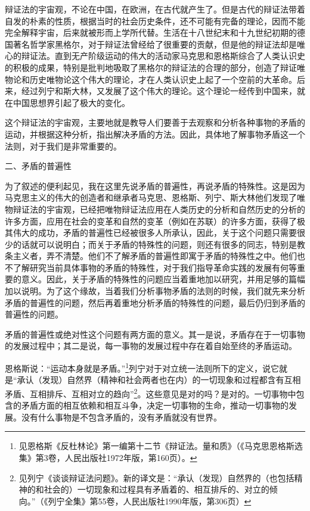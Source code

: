 \documentclass[UTF8, 12pt, a4paper]{ctexrep}
\begin{document}
辩证法的宇宙观，不论在中国，在欧洲，在古代就产生了。但是古代的辩证法带着自发的朴素的性质，根据当时的社会历史条件，还不可能有完备的理论，因而不能完全解释宇宙，后来就被形而上学所代替。生活在十八世纪末和十九世纪初期的德国著名哲学家黑格尔，对于辩证法曾经给了很重要的贡献，但是他的辩证法却是唯心的辩证法。直到无产阶级运动的伟大的活动家马克思和恩格斯综合了人类认识史的积极的成果，特别是批判地吸取了黑格尔的辩证法的合理的部分，创造了辩证唯物论和历史唯物论这个伟大的理论，才在人类认识史上起了一个空前的大革命。后来，经过列宁和斯大林，又发展了这个伟大的理论。这个理论一经传到中国来，就在中国思想界引起了极大的变化。

这个辩证法的宇宙观，主要地就是教导人们要善于去观察和分析各种事物的矛盾的运动，并根据这种分析，指出解决矛盾的方法。因此，具体地了解事物矛盾这一个法则，对于我们是非常重要的。

二、矛盾的普遍性

为了叙述的便利起见，我在这里先说矛盾的普遍性，再说矛盾的特殊性。这是因为马克思主义的伟大的创造者和继承者马克思、恩格斯、列宁、斯大林他们发现了唯物辩证法的宇宙观，已经把唯物辩证法应用在人类历史的分析和自然历史的分析的许多方面，应用在社会的变革和自然的变革（例如在苏联）的许多方面，获得了极其伟大的成功，矛盾的普遍性已经被很多人所承认，因此，关于这个问题只需要很少的话就可以说明白；而关于矛盾的特殊性的问题，则还有很多的同志，特别是教条主义者，弄不清楚。他们不了解矛盾的普遍性即寓于矛盾的特殊性之中。他们也不了解研究当前具体事物的矛盾的特殊性，对于我们指导革命实践的发展有何等重要的意义。因此，关于矛盾的特殊性的问题应当着重地加以研究，并用足够的篇幅加以说明。为了这个缘故，当着我们分析事物矛盾的法则的时候，我们就先来分析矛盾的普遍性的问题，然后再着重地分析矛盾的特殊性的问题，最后仍归到矛盾的普遍性的问题。

矛盾的普遍性或绝对性这个问题有两方面的意义。其一是说，矛盾存在于一切事物的发展过程中；其二是说，每一事物的发展过程中存在着自始至终的矛盾运动。

恩格斯说：“运动本身就是矛盾。”\footnote{见恩格斯《反杜林论》第一编第十二节《辩证法。量和质》（《马克思恩格斯选集》第3卷，人民出版社1972年版，第160页）。}列宁对于对立统一法则所下的定义，说它就是“承认（发现）自然界（精神和社会两者也在内）的一切现象和过程都含有互相矛盾、互相排斥、互相对立的趋向”\footnote{见列宁《谈谈辩证法问题》。新的译文是：“承认（发现）自然界的（也包括精神的和社会的）一切现象和过程具有矛盾着的、相互排斥的、对立的倾向。”（《列宁全集》第55卷，人民出版社1990年版，第306页）}。这些意见是对的吗？是对的。一切事物中包含的矛盾方面的相互依赖和相互斗争，决定一切事物的生命，推动一切事物的发展。没有什么事物是不包含矛盾的，没有矛盾就没有世界。
\end{document}
